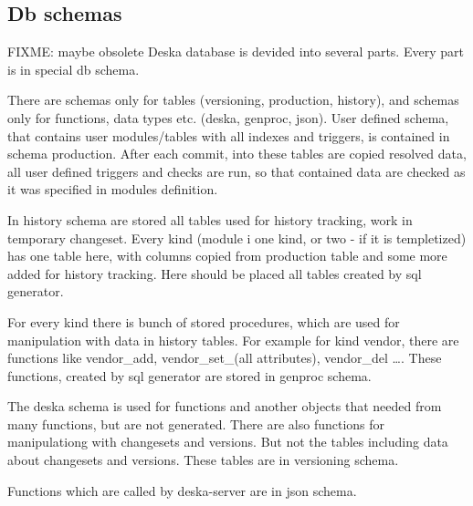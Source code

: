 \documentclass[deska]{subfiles}
\begin{document}
\subsection{Db schemas}
FIXME: maybe obsolete
Deska database is devided into several parts. Every part is in special db schema.

There are schemas only for tables (versioning, production, history), and schemas only for functions, data types etc. (deska, genproc, json).
User defined schema, that contains user modules/tables with all indexes and triggers, is contained in schema production. After each commit, into these tables are copied resolved data, all user defined triggers and checks are run, so that contained data are checked as it was specified in modules definition.

In history schema are stored all tables used for history tracking, work in temporary changeset. Every kind (module i one kind, or two - if it is templetized) has one table here, with columns copied from production table and some more added for history tracking. Here should be placed all tables created by sql generator.

For every kind there is bunch of stored procedures, which are used for manipulation with data in history tables. For example for kind vendor, there are functions like vendor\_add, vendor\_set\_(all attributes), vendor\_del ….
These functions, created by sql generator are stored in genproc schema.

The deska schema is used for functions and another objects that needed from many functions, but are not generated. There are also functions for manipulationg with changesets and versions.
But not the tables including data about changesets and versions. These tables are in versioning schema.

Functions which are called by deska-server are in json schema.
\end{document}
